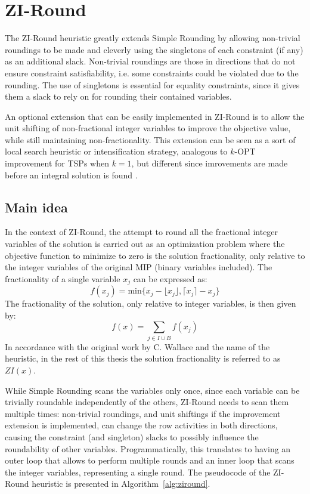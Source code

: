 \documentclass[a4paper,12pt]{book}
\begin{document}
\section{ZI-Round}
The ZI-Round heuristic greatly extends Simple Rounding by allowing non-trivial roundings to be made and cleverly using the singletons of each constraint (if any) as an additional slack. Non-trivial roundings are those in directions that do not ensure constraint satisfiability, i.e. some constraints could be violated due to the rounding. The use of singletons is essential for equality constraints, since it gives them a slack to rely on for rounding their contained variables. \par

An optional extension that can be easily implemented in ZI-Round is to allow the unit shifting of non-fractional integer variables to improve the objective value, while still maintaining non-fractionality. This extension can be seen as a sort of local search heuristic \cite{linker1973} or intensification strategy, analogous to $k$-OPT improvement for TSPs when $k = 1$, but different since imrovements are made before an integral solution is found \cite{wallace2010}. \par

\subsection{Main idea}
In the context of ZI-Round, the attempt to round all the fractional integer variables of the solution is carried out as an optimization problem where the objective function to minimize to zero is the solution fractionality, only relative to the integer variables of the original MIP (binary variables included). The fractionality of a single variable $x_j$ can be expressed as:
\begin{equation}
	f(x_j) = \text{min}\{x_j - \lfloor x_j \rfloor, \lceil x_j \rceil - x_j\}
\end{equation}
The fractionality of the solution, only relative to integer variables, is then given by:
\begin{equation}\label{eq:zi}
	f(x) = \sum_{j \in I \cup B}f(x_j)
\end{equation}
In accordance with the original work by C. Wallace \cite{wallace2010} and the name of the heuristic, in the rest of this thesis the solution fractionality is referred to as $ZI(x)$. \par 

While Simple Rounding scans the variables only once, since each variable can be trivially roundable independently of the others, ZI-Round needs to scan them multiple times: non-trivial roundings, and unit shiftings if the improvement extension is implemented, can change the row activities in both directions, causing the constraint (and singleton) slacks to possibly influence the roundability of other variables. Programmatically, this translates to having an outer loop that allows to perform multiple rounds and an inner loop that scans the integer variables, representing a single round. The pseudocode of the ZI-Round heuristic is presented in Algorithm~\ref{alg:ziround}. \par 
\end{document}
